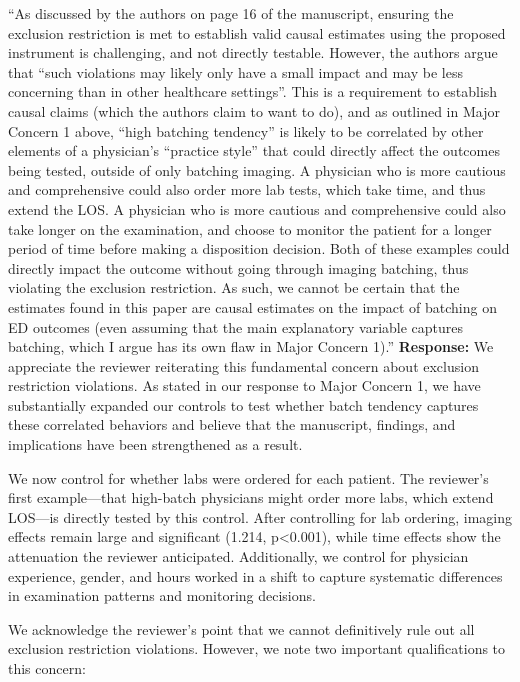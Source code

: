 \documentclass[11pt]{article}
\newenvironment{quote2}
{ \bigskip
\noindent
         \small\em
         \baselineskip=14pt
}
\newcommand{\1}{\hbox{\rm 1\kern-.35em 1}}
\begin{document}
{\begin{quote2}
\noindent ``As discussed by the authors on page 16 of the manuscript, ensuring the exclusion restriction is met to establish valid causal estimates using the proposed instrument is challenging, and not directly testable. However, the authors argue that “such violations may likely only have a small impact and may be less concerning than in other healthcare settings”. This is a requirement to establish causal claims (which the authors claim to want to do), and as outlined in Major Concern 1 above, “high batching tendency” is likely to be correlated by other elements of a physician’s “practice style” that could directly affect the outcomes being tested, outside of only batching imaging. A physician who is more cautious and comprehensive could also order more lab tests, which take time, and thus extend the LOS. A physician who is more cautious and comprehensive could also take longer on the examination, and choose to monitor the patient for a longer period of time before making a disposition decision. Both of these examples could directly impact the outcome without going through imaging batching, thus violating the exclusion restriction. As such, we cannot be certain that the estimates found in this paper are causal estimates on the impact of batching on ED outcomes (even assuming that the main explanatory variable captures batching, which I argue has its own flaw in Major Concern 1).” 
\end{quote2}


\noindent\textbf{Response:} \color{blue}We appreciate the reviewer reiterating this fundamental concern about exclusion restriction violations. As stated in our response to Major Concern 1, we have substantially expanded our controls to test whether batch tendency captures these correlated behaviors and believe that the manuscript, findings, and implications have been strengthened as a result.

We now control for whether labs were ordered for each patient. The reviewer's first example—that high-batch physicians might order more labs, which extend LOS—is directly tested by this control. After controlling for lab ordering, imaging effects remain large and significant (1.214, p<0.001), while time effects show the attenuation the reviewer anticipated. Additionally, we control for physician experience, gender, and hours worked in a shift to capture systematic differences in examination patterns and monitoring decisions.

We acknowledge the reviewer's point that we cannot definitively rule out all exclusion restriction violations. However, we note two important qualifications to this concern:

}
\end{document}
